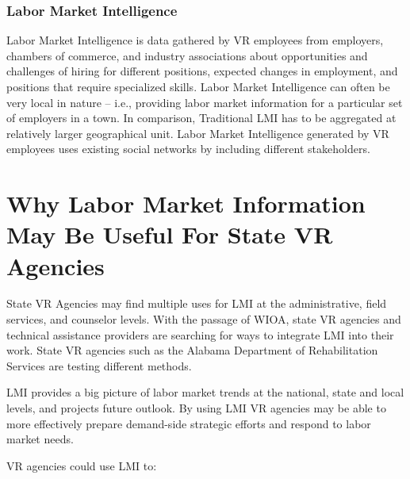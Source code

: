 \documentclass[]{book}
\theoremstyle{definition}
\theoremstyle{definition}
\theoremstyle{definition}
\theoremstyle{remark}
\begin{document}
\subsection{Labor Market Intelligence}\label{labor-market-intelligence}

Labor Market Intelligence is data gathered by VR employees from
employers, chambers of commerce, and industry associations about
opportunities and challenges of hiring for different positions, expected
changes in employment, and positions that require specialized skills.
Labor Market Intelligence can often be very local in nature -- i.e.,
providing labor market information for a particular set of employers in
a town. In comparison, Traditional LMI has to be aggregated at
relatively larger geographical unit. Labor Market Intelligence generated
by VR employees uses existing social networks by including different
stakeholders.

\chapter{Why Labor Market Information May Be Useful For State VR
Agencies}\label{why-labor-market-information-may-be-useful-for-state-vr-agencies}

State VR Agencies may find multiple uses for LMI at the administrative,
field services, and counselor levels. With the passage of WIOA, state VR
agencies and technical assistance providers are searching for ways to
integrate LMI into their work. State VR agencies such as the Alabama
Department of Rehabilitation Services are testing different methods.

LMI provides a big picture of labor market trends at the national, state
and local levels, and projects future outlook. By using LMI VR agencies
may be able to more effectively prepare demand-side strategic efforts
and respond to labor market needs.

VR agencies could use LMI to:
\end{document}
